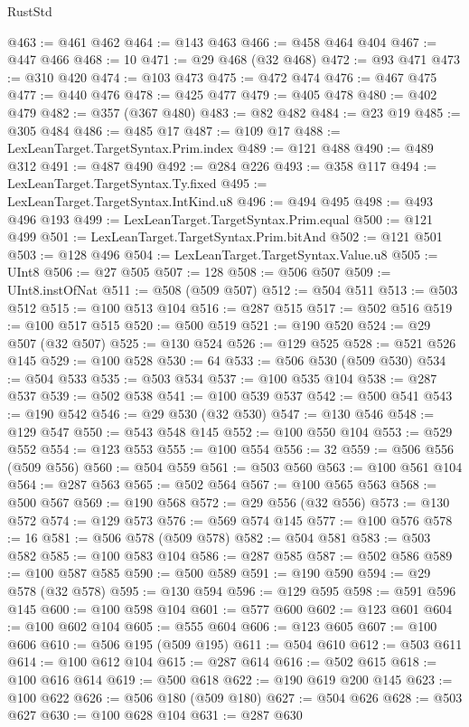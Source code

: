 \begin{lexlean}{RustStd}
\begin{coremodule}
{\begin{coremodule}
{{{{{{{{{{{{{{{{{{{{{{{{{{{{{{{{{{{{{{{{{{{{{{{{{{{{{{{@463 := @461 @462
@464 := @143 @463
@466 := @458 @464 @404
@467 := @447 @466
@468 := 10
@471 := @29 @468 (@32 @468)
@472 := @93 @471
@473 := @310 @420
@474 := @103 @473
@475 := @472 @474
@476 := @467 @475
@477 := @440 @476
@478 := @425 @477
@479 := @405 @478
@480 := @402 @479
@482 := @357 (@367 @480)
@483 := @82 @482
@484 := @23 @19
@485 := @305 @484
@486 := @485 @17
@487 := @109 @17
@488 := LexLeanTarget.TargetSyntax.Prim.index
@489 := @121 @488
@490 := @489 @312
@491 := @487 @490
@492 := @284 @226
@493 := @358 @117
@494 := LexLeanTarget.TargetSyntax.Ty.fixed
@495 := LexLeanTarget.TargetSyntax.IntKind.u8
@496 := @494 @495
@498 := @493 @496 @193
@499 := LexLeanTarget.TargetSyntax.Prim.equal
@500 := @121 @499
@501 := LexLeanTarget.TargetSyntax.Prim.bitAnd
@502 := @121 @501
@503 := @128 @496
@504 := LexLeanTarget.TargetSyntax.Value.u8
@505 := UInt8
@506 := @27 @505
@507 := 128
@508 := @506 @507
@509 := UInt8.instOfNat
@511 := @508 (@509 @507)
@512 := @504 @511
@513 := @503 @512
@515 := @100 @513 @104
@516 := @287 @515
@517 := @502 @516
@519 := @100 @517 @515
@520 := @500 @519
@521 := @190 @520
@524 := @29 @507 (@32 @507)
@525 := @130 @524
@526 := @129 @525
@528 := @521 @526 @145
@529 := @100 @528
@530 := 64
@533 := @506 @530 (@509 @530)
@534 := @504 @533
@535 := @503 @534
@537 := @100 @535 @104
@538 := @287 @537
@539 := @502 @538
@541 := @100 @539 @537
@542 := @500 @541
@543 := @190 @542
@546 := @29 @530 (@32 @530)
@547 := @130 @546
@548 := @129 @547
@550 := @543 @548 @145
@552 := @100 @550 @104
@553 := @529 @552
@554 := @123 @553
@555 := @100 @554
@556 := 32
@559 := @506 @556 (@509 @556)
@560 := @504 @559
@561 := @503 @560
@563 := @100 @561 @104
@564 := @287 @563
@565 := @502 @564
@567 := @100 @565 @563
@568 := @500 @567
@569 := @190 @568
@572 := @29 @556 (@32 @556)
@573 := @130 @572
@574 := @129 @573
@576 := @569 @574 @145
@577 := @100 @576
@578 := 16
@581 := @506 @578 (@509 @578)
@582 := @504 @581
@583 := @503 @582
@585 := @100 @583 @104
@586 := @287 @585
@587 := @502 @586
@589 := @100 @587 @585
@590 := @500 @589
@591 := @190 @590
@594 := @29 @578 (@32 @578)
@595 := @130 @594
@596 := @129 @595
@598 := @591 @596 @145
@600 := @100 @598 @104
@601 := @577 @600
@602 := @123 @601
@604 := @100 @602 @104
@605 := @555 @604
@606 := @123 @605
@607 := @100 @606
@610 := @506 @195 (@509 @195)
@611 := @504 @610
@612 := @503 @611
@614 := @100 @612 @104
@615 := @287 @614
@616 := @502 @615
@618 := @100 @616 @614
@619 := @500 @618
@622 := @190 @619 @200 @145
@623 := @100 @622
@626 := @506 @180 (@509 @180)
@627 := @504 @626
@628 := @503 @627
@630 := @100 @628 @104
@631 := @287 @630
}}}}}}}}}}}}}}}}}}}}}}}}}}}}}}}}}}}}}}}}}}}}}}}}}}}}}}}
\end{coremodule}}
\end{coremodule}
\end{lexlean}
